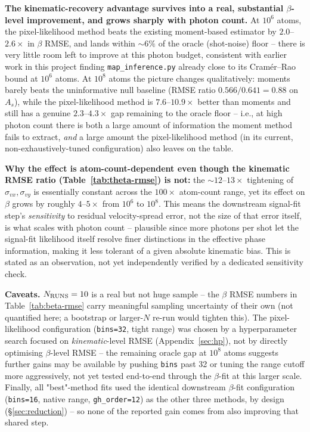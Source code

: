 \documentclass[11pt,a4paper]{article}
\newcommand{\code}[1]{\texttt{#1}}
\begin{document}
\textbf{The kinematic-recovery advantage survives into a real, substantial
$\beta$-level improvement, and grows sharply with photon count.} At
$10^6$ atoms, the pixel-likelihood method beats the existing moment-based
estimator by $2.0$--$2.6\times$ in $\beta$ RMSE, and lands within $\sim\!6\%$
of the oracle (shot-noise) floor -- there is very little room left to
improve at this photon budget, consistent with earlier work in this project
finding \code{map\_inference.py} already close to its Cram\'er--Rao bound
at $10^6$ atoms. At $10^8$ atoms the picture changes qualitatively: moments
barely beats the uninformative null baseline (RMSE ratio $0.566/0.641=0.88$
on $A_s$), while the pixel-likelihood method is $7.6$--$10.9\times$ better
than moments and still has a genuine $2.3$--$4.3\times$ gap remaining to the
oracle floor -- i.e., at high photon count there is both a large amount of
information the moment method fails to extract, \emph{and} a large amount
the pixel-likelihood method (in its current, non-exhaustively-tuned
configuration) also leaves on the table.

\textbf{Why the effect is atom-count-dependent even though the kinematic
RMSE ratio (Table~\ref{tab:theta-rmse}) is not:} the $\sim\!12$--$13\times$
tightening of $\sigma_{vx},\sigma_{vy}$ is essentially constant across the
$100\times$ atom-count range, yet its effect on $\beta$ grows by
roughly $4$--$5\times$ from $10^6$ to $10^8$. This means the downstream
signal-fit step's \emph{sensitivity} to residual velocity-spread error, not
the size of that error itself, is what scales with photon count -- plausible
since more photons per shot let the signal-fit likelihood itself resolve
finer distinctions in the effective phase information, making it less
tolerant of a given absolute kinematic bias. This is stated as an
observation, not yet independently verified by a dedicated sensitivity
check.

\textbf{Caveats.} $N_{\rm RUNS}=10$ is a real but not huge sample -- the
$\beta$ RMSE numbers in Table~\ref{tab:beta-rmse} carry meaningful sampling
uncertainty of their own (not quantified here; a bootstrap or larger-$N$
re-run would tighten this). The pixel-likelihood configuration
(\code{bins=32}, tight range) was chosen by a hyperparameter search focused
on \emph{kinematic}-level RMSE (Appendix~\ref{sec:hp}), not by directly
optimising $\beta$-level RMSE -- the remaining oracle gap at $10^8$ atoms
suggests further gains may be available by pushing \code{bins} past 32 or
tuning the range cutoff more aggressively, not yet tested end-to-end through
the $\beta$-fit at this larger scale. Finally, all "best"-method fits used
the identical downstream $\beta$-fit configuration (\code{bins=16}, native
range, \code{gh\_order=12}) as the other three methods, by design
(\S\ref{sec:reduction}) -- so none of the reported gain comes from also
improving that shared step.
\end{document}
